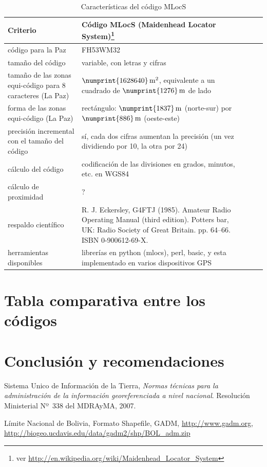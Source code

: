 \documentclass[letterpaper]{article}
\begin{document}
\begin{table}
	\centering
	\begin{tabular}{|l|l|l|l|l|}
		\hline
		Criterio & Código MLocS (Maidenhead Locator System)\footnote{ver 
		\url{http://en.wikipedia.org/wiki/Maidenhead_Locator_System}} \\
		\hline
		código para la Paz & FH53WM32 \\
		tamaño del código & variable, con letras y cifras \\
		tamaño de las zonas equi-código para 8 caracteres (La Paz) & 
		\(\numprint{1628640}\,\mathrm{m^{2}}\), 
		equivalente a un cuadrado de \(\numprint{1276}\,\mathrm{m}\) de lado \\
		forma de las zonas equi-código (La Paz) & rectángulo: 
		\(\numprint{1837}\,\mathrm{m}\) (norte-sur) por 
		\(\numprint{886}\,\mathrm{m}\) (oeste-este) \\
		precisión incremental con el tamaño del código & sí, cada dos 
		cifras aumentan la precisión (un vez dividiendo por 10, la 
		otra por 24) \\
		cálculo del código & codificación de las divisiones en grados, 
		minutos, etc. en WGS84 \\
		cálculo de proximidad & ? \\
		respaldo científico & R. J. Eckersley, G4FTJ (1985). Amateur Radio Operating Manual (third edition). Potters bar, UK: Radio Society of Great Britain. pp. 64–66. ISBN 0-900612-69-X. \\
		herramientas disponibles & librerías en python (mlocs), perl, 
		basic, y esta implementado en varios dispositivos GPS \\
		\hline
	\end{tabular}
	\caption{Características del código MLocS}
	\label{tab:carac_mlocs}
\end{table}

\section{Tabla comparativa entre los códigos}



\section{Conclusión y recomendaciones}

\begin{thebibliography}{99}

  Sistema Unico de Información de la Tierra,
  \emph{Normas técnicas para la administración de la información georeferenciada a nivel nacional}.
  Resolución Ministerial Nº~338 del MDRAyMA,
  2007.

  Límite Nacional de Bolivia,
  Formato Shapefile,
  GADM,
  \url{http://www.gadm.org},
  \url{http://biogeo.ucdavis.edu/data/gadm2/shp/BOL_adm.zip}

\end{thebibliography}
\end{document}
